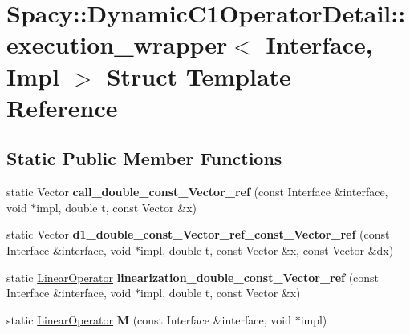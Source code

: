 \hypertarget{structSpacy_1_1DynamicC1OperatorDetail_1_1execution__wrapper}{\section{\-Spacy\-:\-:\-Dynamic\-C1\-Operator\-Detail\-:\-:execution\-\_\-wrapper$<$ \-Interface, \-Impl $>$ \-Struct \-Template \-Reference}
\label{structSpacy_1_1DynamicC1OperatorDetail_1_1execution__wrapper}
}
\subsection*{\-Static \-Public \-Member \-Functions}
\begin{DoxyCompactItemize}
\item 
\hypertarget{structSpacy_1_1DynamicC1OperatorDetail_1_1execution__wrapper_a5025aca2390a11d577e9db6c3ed27335}{static \-Vector {\bfseries call\-\_\-double\-\_\-const\-\_\-\-Vector\-\_\-ref} (const \-Interface \&interface, void $\ast$impl, double t, const \-Vector \&x)}\label{structSpacy_1_1DynamicC1OperatorDetail_1_1execution__wrapper_a5025aca2390a11d577e9db6c3ed27335}

\item 
\hypertarget{structSpacy_1_1DynamicC1OperatorDetail_1_1execution__wrapper_acbe74ffba7a2a41b24b9d588c529fbdf}{static \-Vector {\bfseries d1\-\_\-double\-\_\-const\-\_\-\-Vector\-\_\-ref\-\_\-const\-\_\-\-Vector\-\_\-ref} (const \-Interface \&interface, void $\ast$impl, double t, const \-Vector \&x, const \-Vector \&dx)}\label{structSpacy_1_1DynamicC1OperatorDetail_1_1execution__wrapper_acbe74ffba7a2a41b24b9d588c529fbdf}

\item 
\hypertarget{structSpacy_1_1DynamicC1OperatorDetail_1_1execution__wrapper_aceaa9fc62eae34085e435ace46487e9c}{static \hyperlink{classSpacy_1_1LinearOperator}{\-Linear\-Operator} {\bfseries linearization\-\_\-double\-\_\-const\-\_\-\-Vector\-\_\-ref} (const \-Interface \&interface, void $\ast$impl, double t, const \-Vector \&x)}\label{structSpacy_1_1DynamicC1OperatorDetail_1_1execution__wrapper_aceaa9fc62eae34085e435ace46487e9c}

\item 
\hypertarget{structSpacy_1_1DynamicC1OperatorDetail_1_1execution__wrapper_af2e1cd9b82f405db6a682f252c590dc3}{static \hyperlink{classSpacy_1_1LinearOperator}{\-Linear\-Operator} {\bfseries \-M} (const \-Interface \&interface, void $\ast$impl)}\label{structSpacy_1_1DynamicC1OperatorDetail_1_1execution__wrapper_af2e1cd9b82f405db6a682f252c590dc3}


\end{DoxyCompactItemize}
